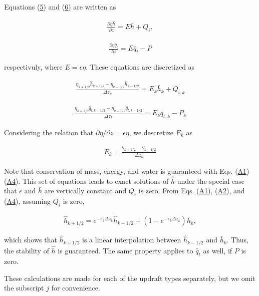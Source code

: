 Equations (\href{p-cum.5}{5}) and (\href{p-cum.6}{6}) are written as

\begin{eqnarray}
 \frac{\partial \eta \hat{h}}{\partial z} = E \bar{h} + Q_i,
\end{eqnarray}

\begin{eqnarray}
 \frac{\partial \eta \hat{q}_t}{\partial z} = E \bar{q}_t -P
\end{eqnarray}

respectivuly, where \(E = \epsilon\eta\). These equations are
discretized as

\begin{eqnarray}
 \frac{\eta_{k+1/2} \hat{h}_{k+1/2} - \eta_{k-1/2} \hat{h}_{k-1/2}}{\Delta z_k} = E_k \bar{h}_k + {Q_{i,k}}  \label{p-cum.A2}
\end{eqnarray}

\begin{eqnarray}
 \frac{\eta_{k+1/2} \hat{q}_{t,k+1/2} - \eta_{k-1/2} \hat{q}_{t,k-1/2}}{\Delta z_k} = E_k {\bar{q}_{t,k}} - P_k  \label{p-cum.A3}
\end{eqnarray}

Considering the relation that
\(\partial \eta/\partial z = \epsilon\eta\), we descretize \(E_k\) as

\begin{eqnarray}
 E_k = \frac{\eta_{k+1/2} - \eta_{k-1/2}}{\Delta z_k}  \label{p-cum.A4}
\end{eqnarray}

Note that conservation of mass, energy, and water is guaranteed with
Eqs. (\href{p-cum.A1}{A1})--(\href{p-cum.A4}{A4}). This set of equations
leads to exact solutions of \(\hat{h}\) under the special case that
\(\epsilon\) and \(\bar{h}\) are vertically constant and \(Q_i\) is
zero. From Eqs. (\href{p-cum.A1}{A1}), (\href{p-cum.A2}{A2}), and
(\href{p-cum.A4}{A4}), assuming \(Q_i\) is zero,

\begin{eqnarray}
 \hat{h}_{k+1/2} = e^{-\epsilon_k \Delta z_k} \hat{h}_{k - 1/2} + (1 - e^{-\epsilon_k \Delta z_k}) \bar{h}_k,
\end{eqnarray}

which shows that \(\hat{h}_{k+1/2}\) is a linear interpolation between
\(\hat{h}_{k - 1/2}\) and \(\bar{h}_k\). Thus, the stability of
\(\hat{h}\) is guaranteed. The same property applies to \(\hat{q}_t\) as
well, if \(P\) is zero.

These calculations are made for each of the updraft types separately,
but we omit the subscript \(j\) for convenience.

